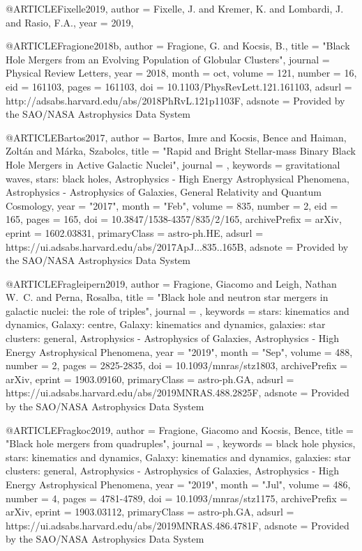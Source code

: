 \documentclass[twocolumn,tighten]{aastex63}
\begin{document}
{{{{{{@ARTICLE{Fixelle2019,
   author = {{Fixelle}, J. and {Kremer}, K. and {Lombardi}, J. and {Rasio}, F.A.},
     year = 2019,
}

@ARTICLE{Fragione2018b,
   author = {{Fragione}, G. and {Kocsis}, B.},
    title = "{Black Hole Mergers from an Evolving Population of Globular Clusters}",
  journal = {Physical Review Letters},
     year = 2018,
    month = oct,
   volume = 121,
   number = 16,
      eid = {161103},
    pages = {161103},
      doi = {10.1103/PhysRevLett.121.161103},
   adsurl = {http://adsabs.harvard.edu/abs/2018PhRvL.121p1103F},
  adsnote = {Provided by the SAO/NASA Astrophysics Data System}
}

@ARTICLE{Bartos2017,
       author = {{Bartos}, Imre and {Kocsis}, Bence and {Haiman}, Zolt{\'a}n and
         {M{\'a}rka}, Szabolcs},
        title = "{Rapid and Bright Stellar-mass Binary Black Hole Mergers in Active Galactic Nuclei}",
      journal = {\apj},
     keywords = {gravitational waves, stars: black holes, Astrophysics - High Energy Astrophysical Phenomena, Astrophysics - Astrophysics of Galaxies, General Relativity and Quantum Cosmology},
         year = "2017",
        month = "Feb",
       volume = {835},
       number = {2},
          eid = {165},
        pages = {165},
          doi = {10.3847/1538-4357/835/2/165},
archivePrefix = {arXiv},
       eprint = {1602.03831},
 primaryClass = {astro-ph.HE},
       adsurl = {https://ui.adsabs.harvard.edu/abs/2017ApJ...835..165B},
      adsnote = {Provided by the SAO/NASA Astrophysics Data System}
}

@ARTICLE{Fragleipern2019,
       author = {{Fragione}, Giacomo and {Leigh}, Nathan W.~C. and {Perna}, Rosalba},
        title = "{Black hole and neutron star mergers in galactic nuclei: the role of triples}",
      journal = {\mnras},
     keywords = {stars: kinematics and dynamics, Galaxy: centre, Galaxy: kinematics and dynamics, galaxies: star clusters: general, Astrophysics - Astrophysics of Galaxies, Astrophysics - High Energy Astrophysical Phenomena},
         year = "2019",
        month = "Sep",
       volume = {488},
       number = {2},
        pages = {2825-2835},
          doi = {10.1093/mnras/stz1803},
archivePrefix = {arXiv},
       eprint = {1903.09160},
 primaryClass = {astro-ph.GA},
       adsurl = {https://ui.adsabs.harvard.edu/abs/2019MNRAS.488.2825F},
      adsnote = {Provided by the SAO/NASA Astrophysics Data System}
}

@ARTICLE{Fragkoc2019,
       author = {{Fragione}, Giacomo and {Kocsis}, Bence},
        title = "{Black hole mergers from quadruples}",
      journal = {\mnras},
     keywords = {black hole physics, stars: kinematics and dynamics, Galaxy: kinematics and dynamics, galaxies: star clusters: general, Astrophysics - Astrophysics of Galaxies, Astrophysics - High Energy Astrophysical Phenomena},
         year = "2019",
        month = "Jul",
       volume = {486},
       number = {4},
        pages = {4781-4789},
          doi = {10.1093/mnras/stz1175},
archivePrefix = {arXiv},
       eprint = {1903.03112},
 primaryClass = {astro-ph.GA},
       adsurl = {https://ui.adsabs.harvard.edu/abs/2019MNRAS.486.4781F},
      adsnote = {Provided by the SAO/NASA Astrophysics Data System}
}

}}}}}}
\end{document}

